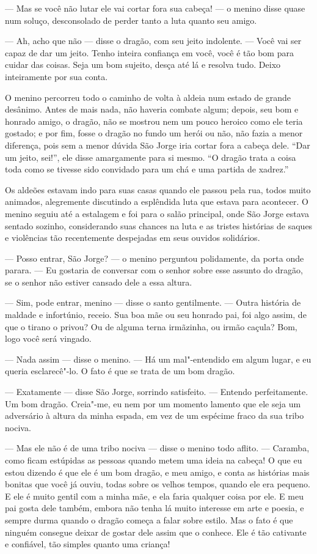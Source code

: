 --- Mas se você não lutar ele vai cortar fora sua cabeça! --- o menino
disse quase num soluço, desconsolado de perder tanto a luta quanto
seu amigo.

--- Ah, acho que não --- disse o dragão, com seu jeito indolente. --- Você
vai ser capaz de dar um jeito. Tenho inteira confiança em você, você
é tão bom para cuidar das coisas. Seja um bom sujeito, desça até lá e
resolva tudo. Deixo inteiramente por sua conta.

O menino percorreu todo o caminho de volta à aldeia num estado de
grande desânimo. Antes de mais nada, não haveria combate algum;
depois, seu bom e honrado amigo, o dragão, não se mostrou nem um
pouco heroico como ele teria gostado; e por fim, fosse o dragão no
fundo um herói ou não, não fazia a menor diferença, pois sem a menor
dúvida São Jorge iria cortar fora a cabeça dele. “Dar um jeito,
sei!”, ele disse amargamente para si mesmo. “O dragão trata a coisa
toda como se tivesse sido convidado para um chá e uma partida de
xadrez.”

Os aldeões estavam indo para suas casas quando ele passou pela rua,
todos muito animados, alegremente discutindo a esplêndida luta que
estava para acontecer. O menino seguiu até a estalagem e foi para o
salão principal, onde São Jorge estava sentado sozinho, considerando
suas chances na luta e as tristes histórias de saques e violências
tão recentemente despejadas em seus ouvidos solidários.

--- Posso entrar, São Jorge? --- o menino perguntou polidamente, da porta
onde parara. --- Eu gostaria de conversar com o senhor sobre esse
assunto do dragão, se o senhor não estiver cansado dele a essa
altura.

--- Sim, pode entrar, menino --- disse o santo gentilmente. --- Outra
história de maldade e infortúnio, receio. Sua boa mãe ou seu honrado
pai, foi algo assim, de que o tirano o privou? Ou de alguma terna
irmãzinha, ou irmão caçula? Bom, logo você será vingado.

--- Nada assim --- disse o menino. --- Há um mal"-entendido em algum lugar, e
eu queria esclarecê"-lo. O fato é que se trata de um bom dragão.

--- Exatamente --- disse São Jorge, sorrindo satisfeito. --- Entendo
perfeitamente. Um bom dragão. Creia"-me, eu nem por um momento lamento
que ele seja um adversário à altura da minha espada, em vez de um
espécime fraco da sua tribo nociva.

--- Mas ele não é de uma tribo nociva --- disse o menino todo aflito. ---
Caramba, como ficam estúpidas as pessoas quando metem uma ideia na
cabeça! O que eu estou dizendo é que ele é um bom dragão, e meu
amigo, e conta as histórias mais bonitas que você já ouviu, todas
sobre os velhos tempos, quando ele era pequeno. E ele é muito gentil
com a minha mãe, e ela faria qualquer coisa por ele. E meu pai gosta
dele também, embora não tenha lá muito interesse em arte e poesia, e
sempre durma quando o dragão começa a falar sobre estilo. Mas o fato
é que ninguém consegue deixar de gostar dele assim que o conhece. Ele
é tão cativante e confiável, tão simples quanto uma criança!

